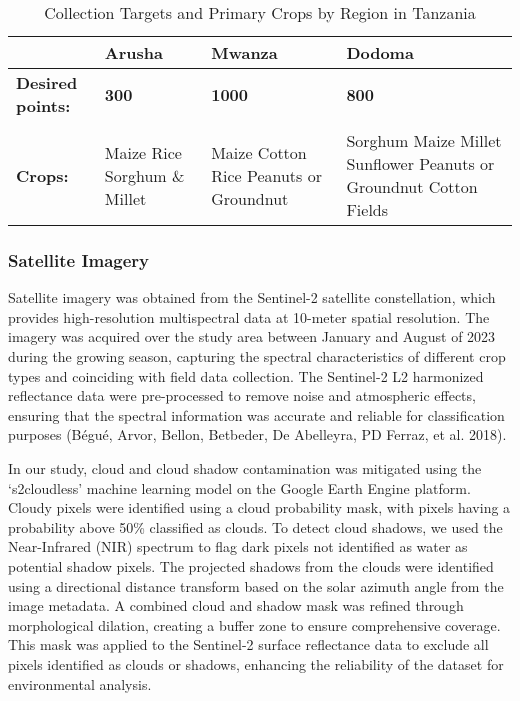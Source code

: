\documentclass[
  journal,
  twocolumn]{IEEEtran}
\begin{document}
\begin{table}[h!]
\centering
\begin{tabular}{@{}lp{4cm}p{4cm}p{4cm}@{}}
\toprule
& \textbf{Arusha} & \textbf{Mwanza} & \textbf{Dodoma} \\ \midrule
\textbf{Desired points:} & \textbf{300} & \textbf{1000} & \textbf{800} \\ 
\midrule \\
\textbf{Crops:} & Maize \newline Rice \newline Sorghum \& Millet 
               & Maize \newline Cotton \newline Rice \newline Peanuts or Groundnut 
               & Sorghum \newline Maize \newline Millet \newline Sunflower \newline Peanuts or Groundnut \newline Cotton Fields \\ 
\bottomrule
\end{tabular}
\caption{Collection Targets and Primary Crops by Region in Tanzania}
\label{tab:data_n}
\end{table}

\hypertarget{satellite-imagery}{%
\subsubsection{Satellite Imagery}\label{satellite-imagery}}

Satellite imagery was obtained from the Sentinel-2 satellite
constellation, which provides high-resolution multispectral data at
10-meter spatial resolution. The imagery was acquired over the study
area between January and August of 2023 during the growing season,
capturing the spectral characteristics of different crop types and
coinciding with field data collection. The Sentinel-2 L2 harmonized
reflectance data were pre-processed to remove noise and atmospheric
effects, ensuring that the spectral information was accurate and
reliable for classification purposes (Bégué, Arvor, Bellon, Betbeder, De
Abelleyra, PD Ferraz, et al. 2018).

In our study, cloud and cloud shadow contamination was mitigated using
the `s2cloudless' machine learning model on the Google Earth Engine
platform. Cloudy pixels were identified using a cloud probability mask,
with pixels having a probability above 50\% classified as clouds. To
detect cloud shadows, we used the Near-Infrared (NIR) spectrum to flag
dark pixels not identified as water as potential shadow pixels. The
projected shadows from the clouds were identified using a directional
distance transform based on the solar azimuth angle from the image
metadata. A combined cloud and shadow mask was refined through
morphological dilation, creating a buffer zone to ensure comprehensive
coverage. This mask was applied to the Sentinel-2 surface reflectance
data to exclude all pixels identified as clouds or shadows, enhancing
the reliability of the dataset for environmental analysis.
\end{document}
